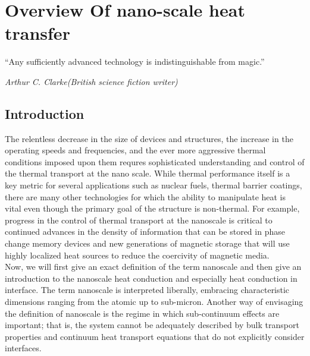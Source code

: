 
\chapter{Overview Of nano-scale heat transfer}  %

\graphicspath{{Chapter1/}}



\setlength{\epigraphwidth}{0.6\textwidth}
\epigraph{“Any sufficiently advanced technology is indistinguishable from magic.”}
{\textit{Arthur C. Clarke(British science fiction writer)}}

\section{Introduction}
The relentless decrease in the size of devices and structures, the increase in the operating speeds and frequencies, and the ever more aggressive thermal conditions imposed upon them requres sophisticated understanding and control of the thermal transport at the nano scale\cite{cahill2014nanoscale}.
While thermal performance itself is a key metric for several applications such as nuclear fuels, thermal barrier coatings, there are many other technologies for which the ability to manipulate heat is vital even though the primary goal of the structure is non-thermal. For example, progress in the control of thermal transport at the nanoscale is critical to continued advances in the density of information that can be stored in phase change memory devices and new
generations of magnetic storage that will use highly localized heat sources to reduce the coercivity
of magnetic media.\\
\indent Now, we will first give an exact definition of the term nanoscale and then give an introduction to the nanoscale heat conduction and especially heat conduction in interface. The term nanoscale is
interpreted liberally, embracing characteristic dimensions
ranging from the atomic up to sub-micron. Another way of
envisaging the definition of nanoscale is the regime in which
sub-continuum effects are important; that is, the system cannot
be adequately described by bulk transport properties and
continuum heat transport equations that do not explicitly
consider interfaces.
